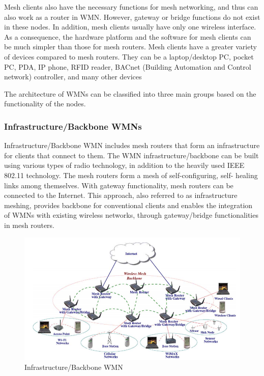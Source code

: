 \documentclass[12pt,a4paper]{report}
\begin{document}
Mesh clients also have the necessary functions for mesh networking, and thus can also
work as a router in WMN. However, gateway or bridge functions do not exist in these nodes.
In addition, mesh clients usually have only one wireless interface. As a consequence, the
hardware platform and the software for mesh clients can be much simpler than those for mesh
routers. Mesh clients have a greater variety of devices compared to mesh routers. They can be
a laptop/desktop PC, pocket PC, PDA, IP phone, RFID reader, BACnet (Building Automation
and Control network) controller, and many other devices

The architecture of WMNs can be classified into three main groups based on the
functionality of the nodes.

\subsubsection{Infrastructure/Backbone WMNs}
Infrastructure/Backbone WMN includes mesh routers that form
an infrastructure for clients that connect to them. The WMN infrastructure/backbone can be built using various types of radio technology, in addition to the heavily used
IEEE 802.11 technology. The mesh routers form a mesh of self-configuring, self-
healing links among themselves. With gateway functionality, mesh routers can be
connected to the Internet. This approach, also referred to as infrastructure meshing,
provides backbone for conventional clients and enables the integration of WMNs
with existing wireless networks, through gateway/bridge functionalities in mesh
routers.
\begin{figure}[hbtp]
\centering
\includegraphics[scale=0.75]{infrastructure-mesh-clear.png}
\caption{Infrastructure/Backbone WMN}
\end{figure}
\end{document}
